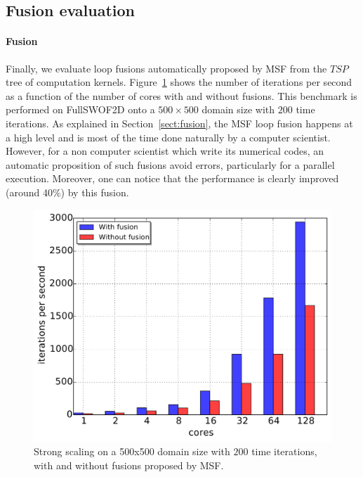 \subsection{Fusion evaluation}

\paragraph{\textbf{Fusion}} Finally, we evaluate loop fusions automatically proposed by MSF from the $TSP$ tree of computation kernels. Figure~\ref{fig:fusion} shows the number of iterations per second as a function of the number of cores with and without fusions. This benchmark is performed on FullSWOF2D onto a $500 \times 500$ domain size with $200$ time iterations. As explained in Section~\ref{sect:fusion}, the MSF loop fusion happens at a high level and is most of the time done naturally by a computer scientist. However, for a non computer scientist which write its numerical codes, an automatic proposition of such fusions avoid errors, particularly for a parallel execution. Moreover, one can notice that the performance is clearly improved (around 40\%) by this fusion.

\begin{figure}[!h]\begin{center}
  \includegraphics[width=.6\textwidth]{../results/task_scaling/500_200/fusVSbase.pdf}
  \caption{Strong scaling on a 500x500 domain size with $200$ time iterations, with and without fusions proposed by MSF.}
  \label{fig:fusion}
\end{center}\end{figure}


